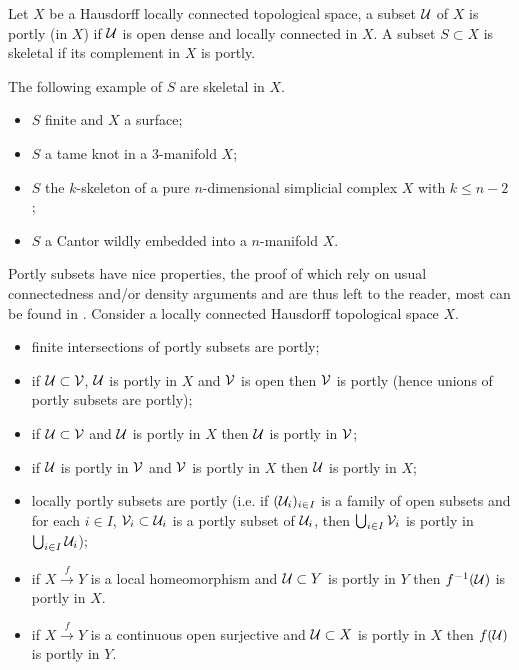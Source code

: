\begin{defi}\label{def:portly_skeletal_subset} Let $X$ be a Hausdorff locally connected topological space, a subset $\mathcal{U}$ of $X$ is portly (in $X$) if $\mathcal{U}$ is open dense and locally connected in $X$. A subset $S\subset X$ is skeletal if its complement in $X$ is portly.
\end{defi}

\begin{ex}\label{ex:following_example_skeletal_itemize} The following example of $S$ are skeletal in $X$.
\begin{itemize}
 \item $S$ finite  and $X$ a surface;
 \item $S$ a tame knot  in a $3$-manifold $X$;
 \item $S$ the $k$-skeleton of a pure $n$-dimensional simplicial complex $X$ with $k\leq n-2$;
 \item $S$ a Cantor wildly embedded into a $n$-manifold $X$.
\end{itemize} 
 \end{ex}





Portly subsets have nice properties, the proof of which rely on usual connectedness and/or density arguments and are thus left to the reader,
most can be found in \cite{MR0123298,MR1152367,MR2599123,thesis}. Consider a locally connected Hausdorff topological space $X$.
\begin{itemize}
 \item finite intersections of portly subsets are portly;
 \item if $\mathcal{U}\subset \mathcal V$, $\mathcal{U}$ is portly in $X$ and $\mathcal V$ is open then $\mathcal V$ is portly (hence unions of portly subsets are portly);
 \item if $\mathcal{U}\subset \mathcal V$ and $\mathcal{U}$ is portly in $X$ then $\mathcal{U}$ is portly in $\mathcal V$;
 \item if $\mathcal{U}$ is portly in $\mathcal V$ and $\mathcal V$ is portly in $X$ then $\mathcal{U}$ is portly in $X$;

 \item locally portly subsets are portly (i.e. if $(\mathcal{U}_i)_{i\in I}$ is a family of open subsets and for each $i\in I$, $\mathcal V_i\subset \mathcal{U}_i$ is a portly subset of $\mathcal{U}_i$, then $\bigcup_{i\in I}\mathcal V_i$ is portly in $\bigcup_{i\in I}\mathcal{U}_i$);
 \item if $X\xrightarrow{f} Y$ is a local homeomorphism and $\mathcal{U}\subset Y$ is portly in $Y$ then $f^{-1}(\mathcal{U})$ is portly in $X$.
 \item if $X\xrightarrow{f} Y$ is a continuous open surjective and $\mathcal{U}\subset X$ is portly in $X$ then $f(\mathcal{U})$ is portly in $Y
 $.
\end{itemize}




